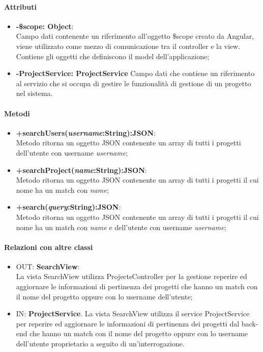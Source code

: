 	\paragraph{Attributi}
	\begin{itemize}
		\item \textbf{-\$scope: Object}:\\
			Campo dati contenente un riferimento all'oggetto \$scope creato da Angular, viene utilizzato come mezzo di comunicazione tra il controller e la view. Contiene gli oggetti che definiscono il model dell'applicazione;
		\item \textbf{-ProjectService: ProjectService}
			Campo dati che contiene un riferimento al servizio che si occupa di gestire le funzionalità di gestione di un progetto nel sistema.
	\end{itemize}
	
	\paragraph{Metodi}
	\begin{itemize}
	  \item \textbf{+searchUsers(\textit{username}:String):JSON}:\\
		  Metodo ritorna un oggetto JSON contenente un array di tutti i progetti dell'utente con username \textit{username};
	  \item \textbf{+searchProject(\textit{name}:String):JSON}:\\
		  Metodo ritorna un oggetto JSON contenente un array di tutti i progetti il cui nome ha un match con \textit{name};
	  \item \textbf{+search(\textit{query}:String):JSON}:\\
		  Metodo ritorna un oggetto JSON contenente un array di tutti i progetti il cui nome ha un match con \textit{name} e dell'utente con username \textit{username};
		  
	\end{itemize}
	\paragraph{Relazioni con altre classi}
	\begin{itemize}
	  \item OUT: \textbf{SearchView}:\\
		La vista SearchView utilizza ProjectsController per la gestione reperire ed aggiornare le informazioni di pertinenza dei progetti che hanno un match con il nome del progetto oppure con lo username dell'utente;	
	  \item IN: \textbf{ProjectService}.
		La vista SearchView utilizza il service ProjectService per reperire ed aggiornare le informazioni di pertinenza dei progetti dal back-end che hanno un match con il nome del progetto oppure con lo username dell'utente proprietario a seguito di un'interrogazione.	
	\end{itemize}		
	
